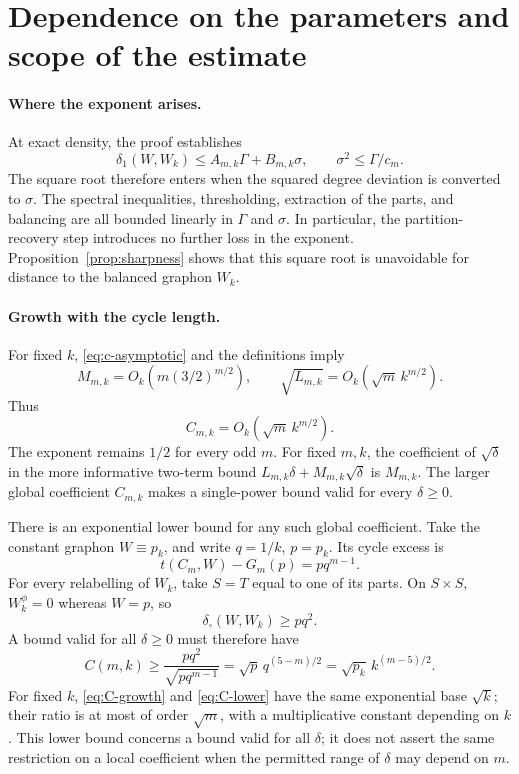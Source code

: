 \documentclass[11pt]{article}
\theoremstyle{remark}
\newcommand{\dsq}{\delta_{\square}}
\begin{document}
\section{Dependence on the parameters and scope of the estimate}

\paragraph{Where the exponent arises.}
At exact density, the proof establishes
\[
 \delta_1(W,W_k)\leq A_{m,k}\Gamma+B_{m,k}\sigma,
 \qquad \sigma^2\leq\Gamma/c_m.
\]
The square root therefore enters when the squared degree deviation is
converted to $\sigma$. The spectral inequalities, thresholding,
extraction of the parts, and balancing are all bounded linearly in
$\Gamma$ and $\sigma$. In particular, the partition-recovery step
introduces no further loss in the exponent. Proposition~\ref{prop:sharpness}
shows that this square root is unavoidable for distance to the
balanced graphon $W_k$.

\paragraph{Growth with the cycle length.}
For fixed $k$, \eqref{eq:c-asymptotic} and the definitions imply
\[
 M_{m,k}=O_k\!\left(m(3/2)^{m/2}\right),
 \qquad
 \sqrt{L_{m,k}}=O_k\!\left(\sqrt m\,k^{m/2}\right).
\]
Thus
\begin{equation}\label{eq:C-growth}
 C_{m,k}=O_k\!\left(\sqrt m\,k^{m/2}\right).
\end{equation}
The exponent remains $1/2$ for every odd $m$.
For fixed $m,k$, the coefficient of $\sqrt{\delta}$ in the more
informative two-term bound
$L_{m,k}\delta+M_{m,k}\sqrt{\delta}$ is $M_{m,k}$.
The larger global coefficient $C_{m,k}$ makes a single-power bound
valid for every $\delta\geq0$.

There is an exponential lower bound for any such global coefficient.
Take the constant graphon $W\equiv p_k$, and write $q=1/k$, $p=p_k$.
Its cycle excess is
\[
 t(C_m,W)-G_m(p)=pq^{m-1}.
\]
For every relabelling of $W_k$, take $S=T$ equal to one of its parts.
On $S\times S$, $W_k^\phi=0$ whereas $W=p$, so
\[
 \dsq(W,W_k)\geq pq^2.
\]
A bound valid for all $\delta\geq0$ must therefore have
\begin{equation}\label{eq:C-lower}
 C(m,k)\geq\frac{pq^2}{\sqrt{pq^{m-1}}}
 =\sqrt p\,q^{(5-m)/2}
 =\sqrt{p_k}\,k^{(m-5)/2}.
\end{equation}
For fixed $k$, \eqref{eq:C-growth} and \eqref{eq:C-lower} have the
same exponential base $\sqrt{k}$; their ratio is at most of order
$\sqrt m$, with a multiplicative constant depending on $k$.
This lower bound concerns a bound valid for all $\delta$; it does not
assert the same restriction on a local coefficient when the permitted
range of $\delta$ may depend on $m$.
\end{document}
